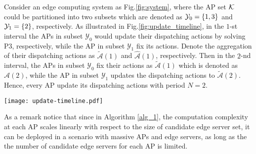 \begin{example}
    \label{exp:update}
    Consider an edge computing system as Fig.\ref{fig:system}, where the AP set $\mathcal{K}$ could be partitioned into two subsets which are denoted as $\mathcal{Y}_{0} = \{1,3\}$ and $\mathcal{Y}_{1} = \{2\}$, respectively.
    As illustrated in Fig.\ref{fig:update_timeline}, in the $1$-st interval the APs in subset $\mathcal{Y}_{0}$ would update their dispatching actions by solving P3, respectively, while the AP in subset $\mathcal{Y}_{1}$ fix its actions.
    Denote the aggregation of their dispatching actions as $\tilde{\mathcal{A}}(1)$ and $\hat{\mathcal{A}}(1)$, respectively.
    Then in the $2$-nd interval, the APs in subset $\mathcal{Y}_{0}$ fix their actions as $\tilde{\mathcal{A}}(1)$ which is denoted as $\hat{\mathcal{A}}(2)$, while 
    the AP in subset $\mathcal{Y}_{1}$ updates the dispatching actions to $\tilde{\mathcal{A}}(2)$.
    Hence, every AP update its dispatching actions with period $N=2$.
    \begin{figure*}[htp!]
        \centering
        \texttt{[image: update-timeline.pdf]}
        \caption{The Illustration of Example \ref{exp:update}.}
        \label{fig:update_timeline}
    \end{figure*}
\end{example}

As a remark notice that since in Algorithm \ref{alg_1}, the computation complexity at each AP scales linearly with respect to {the size of candidate edge server set}, it can be deployed in a scenario with massive APs and edge servers, as long as the {the number of candidate edge servers for each AP} is limited.

